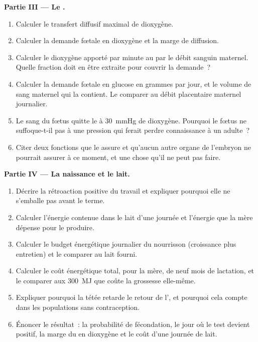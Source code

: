 \begin{problem}
\medskip
\noindent\textbf{Partie III --- Le .}
\begin{enumerate}[resume]
  \item Calculer le transfert diffusif maximal de dioxygène.
  \item Calculer la demande fœtale en dioxygène et la marge de
        diffusion.
  \item Calculer le dioxygène apporté par minute au  par le débit
        sanguin maternel. Quelle fraction doit en être extraite pour
        couvrir la demande~?
  \item Calculer la demande fœtale en glucose en grammes par jour, et le
        volume de sang maternel qui la contient. Le comparer au débit
        placentaire maternel journalier.
  \item Le sang du fœtus quitte le  à \qty{30}{mmHg} de
        dioxygène. Pourquoi le fœtus ne suffoque-t-il pas à une pression
        qui ferait perdre connaissance à un adulte~?
  \item Citer deux fonctions que le  assure et qu'aucun autre
        organe de l'embryon ne pourrait assurer à ce moment, et une
        chose qu'il ne peut pas faire.
\end{enumerate}

\medskip
\noindent\textbf{Partie IV --- La naissance et le lait.}
\begin{enumerate}[resume]
  \item Décrire la rétroaction positive du travail et expliquer
        pourquoi elle ne s'emballe pas avant le terme.
  \item Calculer l'énergie contenue dans le lait d'une journée et
        l'énergie que la mère dépense pour le produire.
  \item Calculer le budget énergétique journalier du nourrisson
        (croissance plus entretien) et le comparer au lait fourni.
  \item Calculer le coût énergétique total, pour la mère, de neuf mois
        de lactation, et le comparer aux \qty{300}{MJ} que coûte la
        grossesse elle-même.
  \item Expliquer pourquoi la tétée retarde le retour de l', et
        pourquoi cela compte dans les populations sans contraception.
  \item Énoncer le résultat~: la probabilité de fécondation, le jour où
        le test devient positif, la marge du  en dioxygène et le
        coût d'une journée de lait.
\end{enumerate}
\end{problem}
